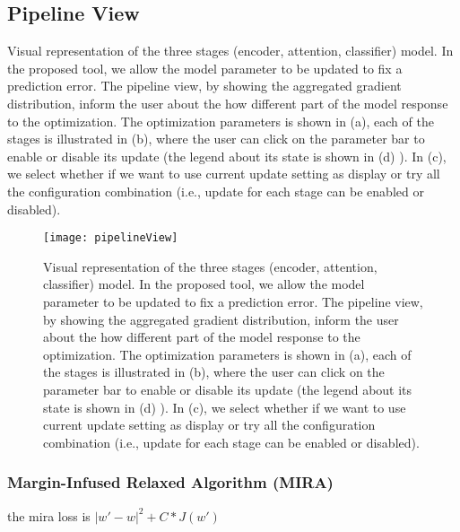 \subsection{Pipeline View}

Visual representation of the three stages (encoder, attention, classifier) model. In the proposed tool, we allow the model parameter to be updated to fix a prediction error. The pipeline view, by showing the aggregated gradient distribution, inform the user about the how different part of the model response to the optimization.
%
The optimization parameters is shown in (a), each of the stages is illustrated in (b), where the user can click on the parameter bar to enable or disable its update (the legend about its state is shown in (d) ). In (c), we select whether if we want to use current update setting as display or try all the configuration combination (i.e., update for each stage can be enabled or disabled).

\begin{figure}[htbp]
\centering
\vspace{-2mm}
 \texttt{[image: pipelineView]}
 \caption{
Visual representation of the three stages (encoder, attention, classifier) model. In the proposed tool, we allow the model parameter to be updated to fix a prediction error. The pipeline view, by showing the aggregated gradient distribution, inform the user about the how different part of the model response to the optimization.
%
The optimization parameters is shown in (a), each of the stages is illustrated in (b), where the user can click on the parameter bar to enable or disable its update (the legend about its state is shown in (d) ). In (c), we select whether if we want to use current update setting as display or try all the configuration combination (i.e., update for each stage can be enabled or disabled).
 }
\label{fig:modelPipeline}
\end{figure}

\subsubsection{Margin-Infused Relaxed Algorithm (MIRA)}
the mira loss is $|w' - w|^2 + C * J(w')$
